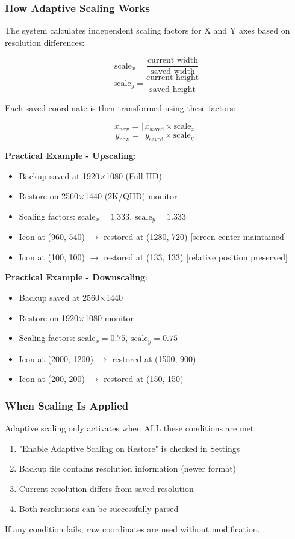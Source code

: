 \documentclass[a4paper,11pt]{article}
\begin{document}
\subsubsection{How Adaptive Scaling Works}

The system calculates independent scaling factors for X and Y axes
based on resolution differences:

$$\text{scale}_x = \frac{\text{current width}}{\text{saved width}}$$
$$\text{scale}_y = \frac{\text{current height}}{\text{saved height}}$$

Each saved coordinate is then transformed using these factors:

$$x_{\text{new}} = \lfloor x_{\text{saved}} \times \text{scale}_x \rfloor$$
$$y_{\text{new}} = \lfloor y_{\text{saved}} \times \text{scale}_y \rfloor$$

\textbf{Practical Example - Upscaling}:
\begin{itemize}
  \item Backup saved at 1920×1080 (Full HD)
  \item Restore on 2560×1440 (2K/QHD) monitor
  \item Scaling factors: $\text{scale}_x = 1.333$, $\text{scale}_y = 1.333$
  \item Icon at (960, 540) $\rightarrow$ restored at (1280, 720)
    [screen center maintained]
  \item Icon at (100, 100) $\rightarrow$ restored at (133, 133) [relative
    position preserved]
\end{itemize}

\textbf{Practical Example - Downscaling}:
\begin{itemize}
  \item Backup saved at 2560×1440
  \item Restore on 1920×1080 monitor
  \item Scaling factors: $\text{scale}_x = 0.75$, $\text{scale}_y = 0.75$
  \item Icon at (2000, 1200) $\rightarrow$ restored at (1500, 900)
  \item Icon at (200, 200) $\rightarrow$ restored at (150, 150)
\end{itemize}

\subsubsection{When Scaling Is Applied}

\begin{infobox}
  Adaptive scaling only activates when ALL these conditions are met:
  \begin{enumerate}
    \item "Enable Adaptive Scaling on Restore" is checked in Settings
    \item Backup file contains resolution information (newer format)
    \item Current resolution differs from saved resolution
    \item Both resolutions can be successfully parsed
  \end{enumerate}
  If any condition fails, raw coordinates are used without modification.
\end{infobox}
\end{document}
